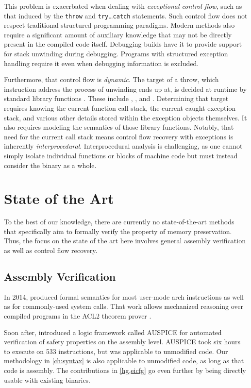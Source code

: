 This problem is exacerbated when dealing with \emph{exceptional control flow}, such as that induced by the \Cpp{} \lstinline|throw| and \lstinline|try|\dots\lstinline|catch| statements.
Such control flow does not respect traditional structured programming paradigms.
Modern methods also require a significant amount of auxiliary knowledge that may not be directly present in the compiled code itself.
Debugging builds have it to provide support for stack unwinding during debugging.
Programs with structured exception handling require it even when debugging information is excluded.

Furthermore, that control flow is \emph{dynamic}.
The target of a throw, which instruction address the process of unwinding ends up at, is decided at runtime by standard library functions \autocite{cxxEhAbi}.
These include , ,
and .
Determining that target requires knowing the current function call stack, the current caught exception stack, and various other details stored within the exception objects themselves.
It also requires modeling the semantics of those library functions.
Notably, that need for the current call stack means control flow recovery with exceptions is inherently \emph{interprocedural}.
Interprocedural analysis is challenging, as one cannot simply isolate individual functions or blocks of machine code but must instead consider the binary as a whole.

\section{State of the Art}
To the best of our knowledge, there are currently no state-of-the-art methods that specifically aim to formally verify the property of memory preservation.
Thus, the focus on the state of the art here involves general assembly verification as well as control flow recovery.

\subsection{Assembly Verification}
In 2014, \textcite{goel2014syscalls,goelphd} produced formal semantics
for most user-mode \gls{arch} instructions as well as for commonly-used system calls.
That work allows mechanized reasoning over compiled programs in the ACL2 theorem prover \autocite{ACL2}.

Soon after, \textcite{tan2015auspice} introduced a logic framework called AUSPICE for automated verification of safety properties on the assembly level.
AUSPICE took six hours to execute on \num{533} instructions, but was applicable to unmodified code.
Our methodology in \cref{ch:syntax} is also applicable to unmodified code, as long as that code is assembly.
The contributions in \cref{hg,eicfg} go even further by being directly usable with existing binaries.

